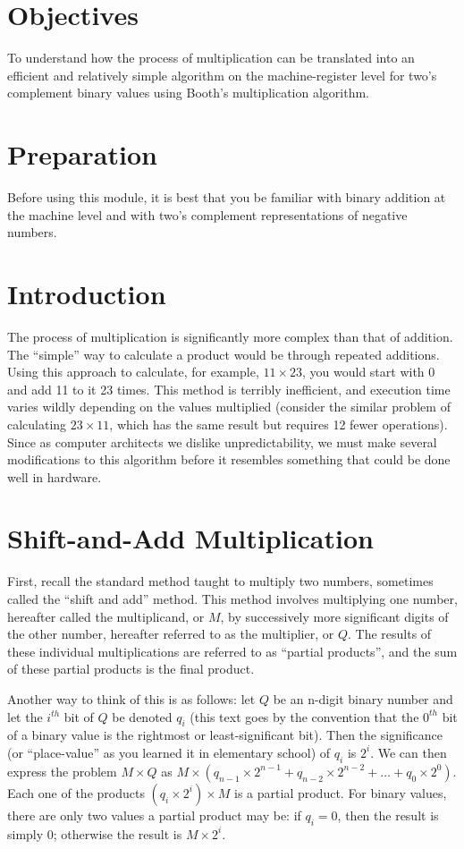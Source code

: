 \documentclass{article}
\begin{document}
\section{Objectives}
To understand how the process of multiplication can be translated into an efficient and relatively simple algorithm on the machine-register level for two's complement binary values using Booth's multiplication algorithm.

\section{Preparation}
Before using this module, it is best that you be familiar with binary addition at the machine level and with two's complement representations of negative numbers.

\section{Introduction}
The process of multiplication is significantly more complex than that of addition.
The ``simple'' way to calculate a product would be through repeated additions.
Using this approach to calculate, for example, $11 \times 23$, you would start with 0 and add 11 to it 23 times.
This method is terribly inefficient, and execution time varies wildly depending on the values multiplied (consider the similar problem of calculating $23 \times 11$, which has the same result but requires 12 fewer operations).
Since as computer architects we dislike unpredictability, we must make several modifications to this algorithm before it resembles something that could be done well in hardware.

\section{Shift-and-Add Multiplication}
First, recall the standard method taught to multiply two numbers, sometimes called the ``shift and add'' method.
This method involves multiplying one number, hereafter called the multiplicand, or $M$, by successively more significant digits of the other number, hereafter referred to as the multiplier, or $Q$.
The results of these individual multiplications are referred to as ``partial products'', and the sum of these partial products is the final product.

Another way to think of this is as follows: let $Q$ be an n-digit binary number and let the $i^{th}$ bit of $Q$ be denoted $q_i$ (this text goes by the convention that the $0^{th}$ bit of a binary value is the rightmost or least-significant bit).
Then the significance (or ``place-value'' as you learned it in elementary school) of $q_i$ is $2^i$.
We can then express the problem $M \times Q$ as $M \times (q_{n-1} \times 2^{n-1} + q_{n-2} \times 2^{n-2} + \ldots + q_{0} \times 2^{0})$.
Each one of the products $(q_i \times 2^{i}) \times M$ is a partial product.
For binary values, there are only two values a partial product may be: if $q_i = 0$, then the result is simply $0$; otherwise the result is $M \times 2^i$.
\end{document}
